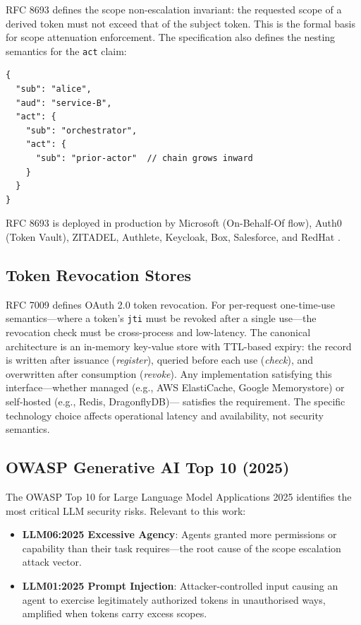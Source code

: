 \documentclass[journal]{IEEEtran}
\begin{document}
RFC 8693 defines the scope non-escalation invariant: the requested scope of a
derived token must not exceed that of the subject token. This is the formal
basis for scope attenuation enforcement. The specification also defines the
nesting semantics for the \texttt{act} claim:

\begin{lstlisting}[language={},caption={Nested act claim per RFC 8693 \S 4.1},
                   label={lst:actchain}]
{
  "sub": "alice",
  "aud": "service-B",
  "act": {
    "sub": "orchestrator",
    "act": {
      "sub": "prior-actor"  // chain grows inward
    }
  }
}
\end{lstlisting}

RFC 8693 is deployed in production by Microsoft (On-Behalf-Of flow), Auth0
(Token Vault), ZITADEL, Authlete, Keycloak, Box, Salesforce, and
RedHat \cite{rfc8693_deploy}.

\subsection{Token Revocation Stores}

RFC 7009 \cite{rfc7009} defines OAuth 2.0 token revocation. For per-request
one-time-use semantics---where a token's \texttt{jti} must be revoked after a
single use---the revocation check must be cross-process and low-latency. The
canonical architecture is an in-memory key-value store with TTL-based expiry:
the record is written after issuance (\textit{register}), queried before each
use (\textit{check}), and overwritten after consumption (\textit{revoke}). Any
implementation satisfying this interface---whether managed (e.g., AWS
ElastiCache, Google Memorystore) or self-hosted (e.g., Redis, DragonflyDB)---
satisfies the requirement. The specific technology choice affects operational
latency and availability, not security semantics.

\subsection{OWASP Generative AI Top 10 (2025)}

The OWASP Top 10 for Large Language Model Applications 2025 \cite{owasp_genai}
identifies the most critical LLM security risks. Relevant to this work:
\begin{itemize}
  \item \textbf{LLM06:2025 Excessive Agency}: Agents granted more permissions
        or capability than their task requires---the root cause of the scope
        escalation attack vector.
  \item \textbf{LLM01:2025 Prompt Injection}: Attacker-controlled input causing
        an agent to exercise legitimately authorized tokens in unauthorised ways,
        amplified when tokens carry excess scopes.
\end{itemize}
\end{document}

